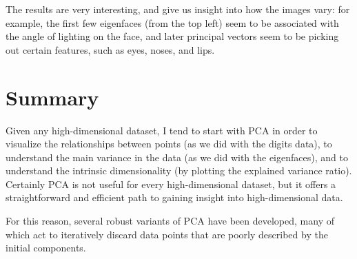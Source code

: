 The results are very interesting, and give us insight into how the images vary: for example, the first few eigenfaces (from the top left) seem to be associated with the angle of lighting on the face, and later principal vectors seem to be picking out certain features, such as eyes, noses, and lips.

\section{Summary}

Given any high-dimensional dataset, I tend to start with PCA in order to visualize the relationships between points (as we did with the digits data), to understand the main variance in the data (as we did with the eigenfaces), and to understand the intrinsic dimensionality (by plotting the explained variance ratio). Certainly PCA is not useful for every high-dimensional dataset, but it offers a straightforward and efficient path to gaining insight into high-dimensional data.

 For this reason, several robust variants of PCA have been developed, many of which act to iteratively discard data points that are poorly described by the initial components.